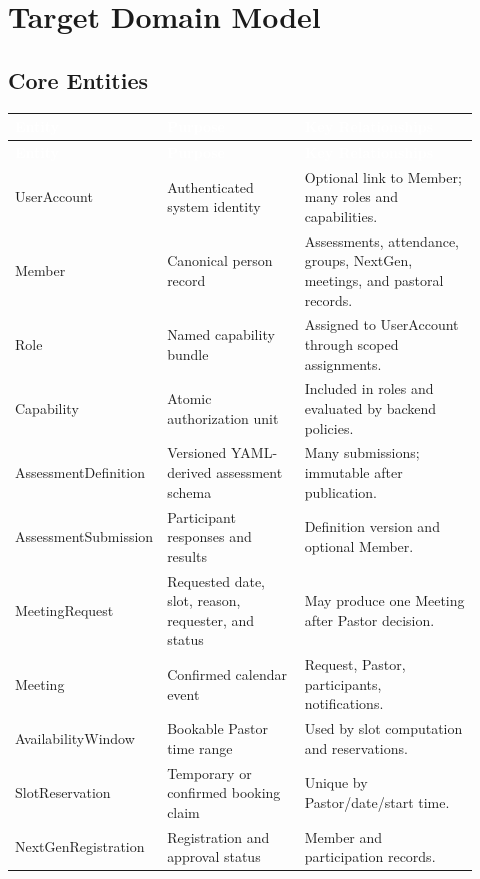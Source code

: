 \documentclass[11pt,a4paper,oneside]{report}
\begin{document}
\chapter{Target Domain Model}

\section{Core Entities}

\begin{longtable}{@{}p{0.24\linewidth} p{0.30\linewidth} p{0.38\linewidth}@{}}
\toprule
\rowcolor{primary}
\textcolor{white}{\textbf{Entity}} & \textcolor{white}{\textbf{Purpose}} & \textcolor{white}{\textbf{Key Relationships}} \\
\midrule
\endfirsthead
\toprule
\rowcolor{primary}
\textcolor{white}{\textbf{Entity}} & \textcolor{white}{\textbf{Purpose}} & \textcolor{white}{\textbf{Key Relationships}} \\
\midrule
\endhead
UserAccount & Authenticated system identity & Optional link to Member; many roles and capabilities. \\
Member & Canonical person record & Assessments, attendance, groups, NextGen, meetings, and pastoral records. \\
Role & Named capability bundle & Assigned to UserAccount through scoped assignments. \\
Capability & Atomic authorization unit & Included in roles and evaluated by backend policies. \\
AssessmentDefinition & Versioned YAML-derived assessment schema & Many submissions; immutable after publication. \\
AssessmentSubmission & Participant responses and results & Definition version and optional Member. \\
MeetingRequest & Requested date, slot, reason, requester, and status & May produce one Meeting after Pastor decision. \\
Meeting & Confirmed calendar event & Request, Pastor, participants, notifications. \\
AvailabilityWindow & Bookable Pastor time range & Used by slot computation and reservations. \\
SlotReservation & Temporary or confirmed booking claim & Unique by Pastor/date/start time. \\
NextGenRegistration & Registration and approval status & Member and participation records. \\

\end{longtable}
\end{document}

